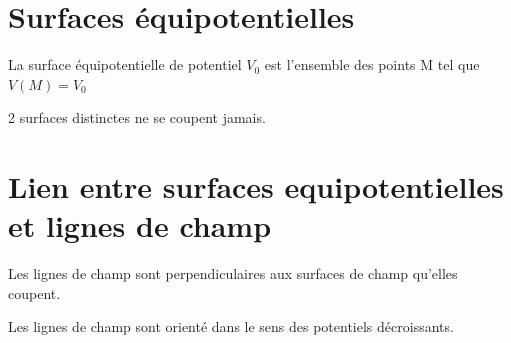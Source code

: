\documentclass[french]{yLectureNote}
\renewcommand{\vec}{\overrightarrow}
\newcommand{\dd}{\mathrm{d}}
\newcommand{\E}{\vec{E}(M)}
\newcommand{\V}{V(M)}
\begin{document}
\section{Surfaces équipotentielles}
\begin{definition}
La surface équipotentielle de potentiel \(V_0\) est l'ensemble des points M tel que \(\V = V_0\)
\end{definition}
2 surfaces distinctes ne se coupent jamais.

%

\section{Lien entre surfaces equipotentielles et lignes de champ}

\begin{theorem}
Les lignes de champ sont perpendiculaires aux surfaces de champ qu'elles coupent.
\end{theorem}
%

\begin{theorem}
 Les lignes de champ sont orienté dans le sens des potentiels décroissants.
\end{theorem}
%
%
%

 
\end{document}
